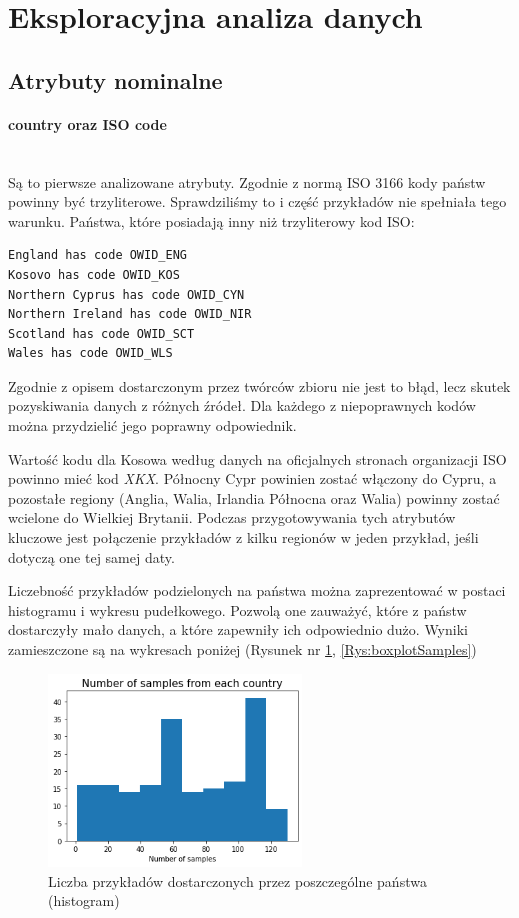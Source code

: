 \documentclass[12pt, oneside]{article}
\begin{document}
\section{Eksploracyjna analiza danych}


\subsection{Atrybuty nominalne}

\paragraph{country oraz ISO code}
\mbox{}\\
Są to pierwsze analizowane atrybuty. Zgodnie z normą ISO 3166 kody państw powinny być trzyliterowe. Sprawdziliśmy to i część przykładów nie spełniała tego warunku. Państwa, które posiadają inny niż trzyliterowy kod ISO:
\begin{verbatim}
England has code OWID_ENG
Kosovo has code OWID_KOS
Northern Cyprus has code OWID_CYN
Northern Ireland has code OWID_NIR
Scotland has code OWID_SCT
Wales has code OWID_WLS
\end{verbatim}
Zgodnie z opisem dostarczonym przez twórców zbioru nie jest to błąd, lecz skutek pozyskiwania danych z różnych źródeł. Dla każdego z niepoprawnych kodów można przydzielić jego poprawny odpowiednik.

Wartość kodu dla Kosowa według danych na oficjalnych stronach organizacji ISO powinno mieć kod \textit{XKX}. Północny Cypr powinien zostać włączony do Cypru, a pozostałe regiony (Anglia, Walia, Irlandia Północna oraz Walia) powinny zostać wcielone do  Wielkiej Brytanii. Podczas przygotowywania tych atrybutów kluczowe jest połączenie przykładów z kilku regionów w jeden przykład, jeśli dotyczą one tej samej daty. 


Liczebność przykładów podzielonych na państwa można zaprezentować w postaci histogramu i wykresu pudełkowego. Pozwolą one zauważyć, które z państw dostarczyły mało danych, a które zapewniły ich odpowiednio dużo. Wyniki zamieszczone są na wykresach poniżej (Rysunek nr \ref{Rys:histogramSamples}, \ref{Rys:boxplotSamples})

\begin{figure}[h]
\centering
\includegraphics[width=0.6\textwidth]{../img/number_of_samples.png} 
\caption{Liczba przykładów dostarczonych przez poszczególne państwa (histogram)}
\label{Rys:histogramSamples}
\end{figure}
\end{document}
